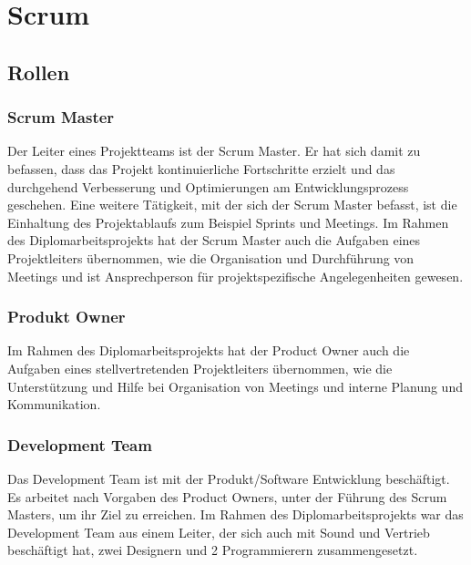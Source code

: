 
\section{Scrum}\label{sec:scrum}

\renewcommand{\kapitelautor}{Autor: Nils} %

\subsection{Rollen}\label{subsec:rollen}

%
\subsubsection{Scrum Master}\label{subsubsec:Scrum-Master}
%
Der Leiter eines Projektteams ist der Scrum Master. Er hat sich damit zu befassen, dass das Projekt kontinuierliche Fortschritte erzielt und das durchgehend Verbesserung und Optimierungen am Entwicklungsprozess geschehen.
Eine weitere Tätigkeit, mit der sich der Scrum Master befasst, ist die Einhaltung des Projektablaufs zum Beispiel Sprints und Meetings.
Im Rahmen des Diplomarbeitsprojekts hat der Scrum Master auch die Aufgaben eines Projektleiters übernommen, wie die Organisation und Durchführung von Meetings und ist Ansprechperson für projektspezifische Angelegenheiten gewesen.
%
\subsubsection{Produkt Owner}\label{subsubsec:Product-Owner}
%

Im Rahmen des Diplomarbeitsprojekts hat der Product Owner auch die Aufgaben eines stellvertretenden Projektleiters übernommen, wie die Unterstützung und Hilfe bei Organisation von Meetings und interne Planung und Kommunikation.
%
\subsubsection{Development Team}\label{subsubsec:Development-Team}
%
Das Development Team ist mit der Produkt/Software Entwicklung beschäftigt. Es arbeitet nach Vorgaben des Product Owners, unter der Führung des Scrum Masters, um ihr Ziel zu erreichen.
Im Rahmen des Diplomarbeitsprojekts war das Development Team aus einem Leiter, der sich auch mit Sound und Vertrieb beschäftigt hat, zwei Designern und 2 Programmierern zusammengesetzt.
%
